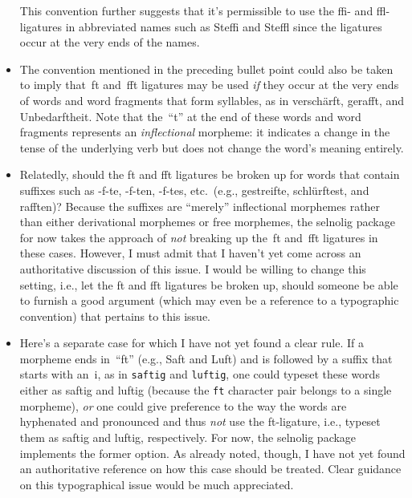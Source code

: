 \documentclass[11pt]{article}
\newcommand{\pkg}[1]{\textsf{#1}}
\newcommand{\opt}[1]{\texttt{#1}}
\begin{document}
\begin{itemize}
This convention further suggests that it's permissible to use the ffi- and ffl-ligatures in abbreviated names such as Steffi and Steffl since the ligatures occur at the very ends of the names. 

\item The convention mentioned in the preceding bullet point could also be taken to imply that~ft and~fft ligatures may be used {\itshape if} they occur at the very ends of words and word fragments that form syllables, as in verschärft, gerafft, and Unbedarftheit. Note that the~\enquote{t} at the end of these words and word fragments represents an \emph{inflectional} morpheme: it indicates a change in the tense of the underlying verb but does not change the word's meaning entirely.

\item Relatedly, should the ft and fft ligatures be broken up for words that contain suffixes such as -f-te, -f-ten, -f-tes, etc.\ (e.g., gestreifte, schlürftes\breaklig t, and rafften)? Because the suffixes are \enquote{merely} inflectional morphemes rather than either derivational morphemes or free morphemes, the \pkg{selnolig} package for now takes the approach of \emph{not} breaking up the~ft and~fft ligatures in these cases. However, I must admit that I haven't yet come across an authoritative discussion of this issue. I would be willing to change this setting, i.e., let the ft and fft ligatures be broken up, should someone be able to furnish a good argument (which may even be a reference to a typographic convention) that pertains to this issue.


\item Here's a separate case for which I have not yet found a clear rule. If a morpheme ends in~\enquote{ft} (e.g., Saft and Luft) and is followed by a suffix that starts with an~i, as in \opt{saftig} and \opt{luftig}, one could typeset these words either as sa\mbox{ft}ig and lu\mbox{ft}ig (because the \opt{ft} character pair belongs to a single morpheme), \emph{or} one could give preference to the way the words are hyphenated and pronounced and thus \emph{not} use the ft-ligature, i.e., typeset them as saf\breaklig tig and luf\breaklig tig, respectively. For now, the \pkg{selnolig} package implements the former option. As already noted, though, I have not yet found an authoritative reference on how this case should be treated. Clear guidance on this typographical issue would be much appreciated.

\end{itemize}
\end{document}
